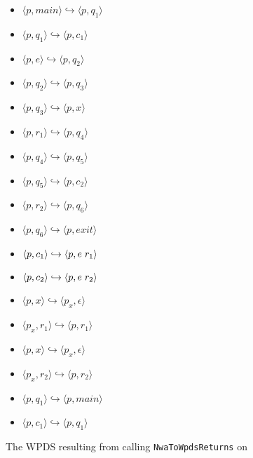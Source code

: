 \begin{figure}[p]
\begin{minipage}{0.42\textwidth}
\begin{itemize}
      \centering
      \item{ $\langle p,main \rangle \hookrightarrow \langle p,q_1 \rangle$}
      \item{ $\langle p,q_1 \rangle \hookrightarrow \langle p,c_1 \rangle$}
      \item{ $\langle p,e \rangle \hookrightarrow \langle p,q_2 \rangle$}
      \item{ $\langle p,q_2 \rangle \hookrightarrow \langle p,q_3 \rangle$}
      \item{ $\langle p,q_3 \rangle \hookrightarrow \langle p,x \rangle$}
      \item{ $\langle p,r_1 \rangle \hookrightarrow \langle p,q_4 \rangle$}
      \item{ $\langle p,q_4 \rangle \hookrightarrow \langle p,q_5 \rangle$}
      \item{ $\langle p,q_5 \rangle \hookrightarrow \langle p,c_2 \rangle$}
      \item{ $\langle p,r_2 \rangle \hookrightarrow \langle p,q_6 \rangle$}
      \item{ $\langle p,q_6 \rangle \hookrightarrow \langle p,exit \rangle$}
      \item{ $\langle p,c_1 \rangle \hookrightarrow \langle p,e \hspace{.1cm} r_1 \rangle$}
      \item{ $\langle p,c_2 \rangle \hookrightarrow \langle p,e \hspace{.1cm} r_2 \rangle$}
      \item{ $\langle p,x \rangle \hookrightarrow \langle p_x, \epsilon \rangle$}
      \item{ $\langle p_x,r_1 \rangle \hookrightarrow \langle p,r_1 \rangle$}
      \item{ $\langle p,x \rangle \hookrightarrow \langle p_x, \epsilon \rangle$}
      \item{ $\langle p_x,r_2 \rangle \hookrightarrow \langle p,r_2 \rangle$}
    \end{itemize}
    \caption{The WPDS resulting from calling \texttt{NwaToWpdsReturns} on }
    \label{Fi:NwaToWpds2}
  \end{minipage}
  \hspace{0.1\textwidth}
  \begin{minipage}{0.42\textwidth}
    \centering
    \begin{itemize}
      \centering
      \item{ $\langle p,q_1 \rangle \hookrightarrow \langle p,main \rangle$}
      \item{ $\langle p,c_1 \rangle \hookrightarrow \langle p,q_1 \rangle$}

\end{itemize}
\end{minipage}
\end{figure}
